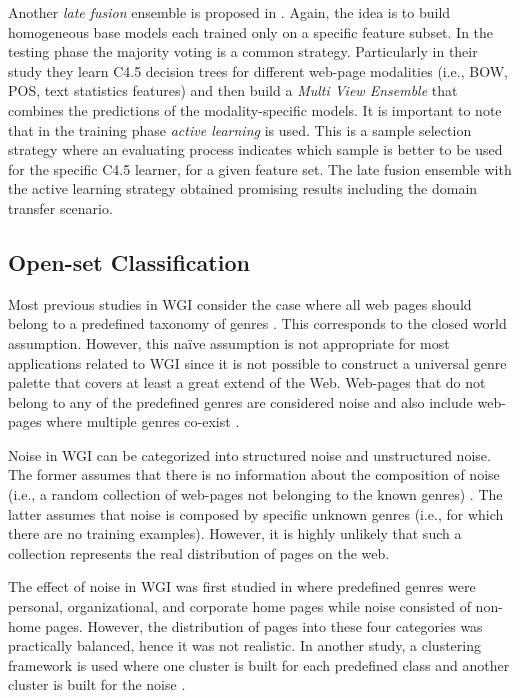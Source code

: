 Another \textit{late fusion} ensemble is proposed in \parencite{finn2006learning}. Again, the idea is to build homogeneous base models each trained only on a specific feature subset. In the testing phase the majority voting is a common strategy. Particularly in their study they learn C4.5 decision trees for different web-page modalities (i.e., BOW, POS, text statistics features) and then build a \textit{Multi View Ensemble} that combines the predictions of the modality-specific models. It is important to note that in the training phase \textit{active learning} is used. This is a sample selection strategy where an evaluating process indicates which sample is better to be used for the specific C4.5 learner, for a given feature set. The late fusion ensemble with the active learning strategy obtained promising results including the domain transfer scenario.

\subsection{Open-set Classification}
\label{chap:relevant_work:sec:openset_and_noise}

Most previous studies in WGI consider the case where all web pages should belong to a predefined taxonomy of genres \parencite{Lim2005,santini2007automatic,kanaris2009learning,jebari2014pureURL}. This corresponds to the closed world assumption. However, this naïve assumption is not appropriate for most applications related to WGI since it is not possible to construct a universal genre palette that covers at least a great extend of the Web. Web-pages that do not belong to any of the predefined genres are considered noise and also include web-pages where multiple genres co-exist \parencite{santini2011cross,levering2008using}. 

Noise in WGI can be categorized into structured noise and  unstructured noise. The former assumes that there is no information about the composition of noise (i.e., a random collection of web-pages not belonging to the known genres) \parencite{santini2011cross}. The latter assumes that noise is composed by specific unknown genres (i.e., for which there are no training examples). However, it is highly unlikely that such a collection  represents the real distribution of pages on the web.

The effect of noise in WGI  was first studied in \parencite{shepherd2004cybergenre,kennedy2005automatic} where predefined genres were personal, organizational, and corporate home pages while noise consisted of non-home pages. However, the distribution of pages into these four categories was practically balanced, hence it was not realistic. In another study, a clustering framework is used where one cluster is built for each predefined class and another cluster is built for the noise \parencite{kennedy2005automatic}. 

